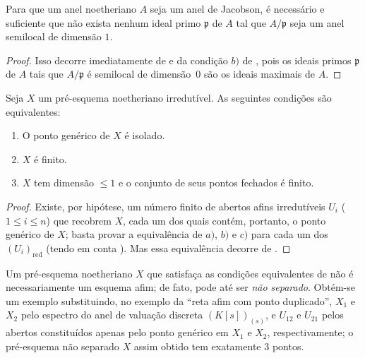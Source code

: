 \begin{corollary}[10.5.2]
\label{IV.10.5.2}
Para que um anel noetheriano $A$ seja um anel de Jacobson, é necessário e suficiente que não exista nenhum ideal primo $\mathfrak{p}$ de $A$ tal que $A/\mathfrak{p}$ seja um anel semilocal de dimensão $1$.
\end{corollary}

\begin{proof}
Isso decorre imediatamente de  e da condição $b)$ de , pois os ideais primos $\mathfrak{p}$ de $A$ tais que $A/\mathfrak{p}$ é semilocal de dimensão~$0$ são os ideais maximais de $A$.
\end{proof}

\begin{corollary}[10.5.3]
\label{IV.10.5.3}
Seja $X$ um pré-esquema noetheriano irredutível.
As seguintes condições são equivalentes:
\begin{enumerate}[label=\emph{\alph*)}]
  \item O ponto genérico de $X$ é isolado.
  \item $X$ é finito.
  \item $X$ tem dimensão $\leq 1$ e o conjunto de seus pontos fechados é finito.
\end{enumerate}
\end{corollary}

\begin{proof}
Existe, por hipótese, um número finito de abertos afins irredutíveis $U_i$ ($1\leq i\leq n$) que recobrem $X$, cada um dos quais contém, portanto, o ponto genérico de $X$; basta provar a equivalência de $a)$, $b)$ e $c)$ para cada um dos $(U_i)_{\mathrm{red}}$ (tendo em conta ).
Mas essa equivalência decorre de .
\end{proof}

\begin{remark}[10.5.4]
\label{IV.10.5.4}
Um pré-esquema noetheriano $X$ que satisfaça as condições equivalentes de  não é necessariamente um esquema afim; de fato, pode até ser \emph{não separado}.
Obtém-se um exemplo substituindo, no exemplo  da ``reta afim com ponto duplicado'', $X_1$ e $X_2$ pelo espectro do anel de valuação discreta $(K[s])_{(s)}$, e $U_{12}$ e $U_{21}$ pelos abertos constituídos apenas pelo ponto genérico em $X_1$ e $X_2$, respectivamente; o pré-esquema não separado $X$ assim obtido tem exatamente $3$ pontos.
\end{remark}

